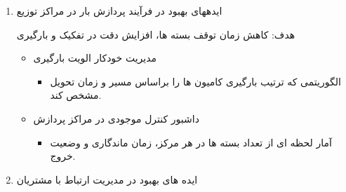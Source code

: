 \documentclass[12pt,a4paper]{report}
\begin{document}
\begin{enumerate}
هدف : کاهش هزینه سوخت، زمان حمل و افزایش بهره وری وسایل نقلیه.
\begin{itemize}
	\item مسیر یابی خودکار
	\begin{itemize}
		\item 
استفاده از الگوریتم های بهینه سازی مسیر بر اساس حجم مرسولات و وضعیت ترافیک. 
		\item 
تخصیص بهینه راننده به مسیر.
	\end{itemize}
	\item سیستم مدیریت نگهداری خودرو ها
	\begin{itemize}
		\item 
ثبت خودکار کیلومتر کارکرد و زمان آخرین سرویس از طریق  یا ورودی راننده.
		\item هشدار خودکار برای سیرویس یا بیمه در آستانه انقاضا.
	\end{itemize}
	\item سیستم سوخت و هزینه های سفر
	\begin{itemize}
		\item
هر راننده هنگام بازگشت هزینه سوخت را در سیستم ثبت می کند.
		\item 
تحلیل مصرف سوخت به تفکیک مسیر و نوع خودرو.
	\end{itemize}
	\item داشبورد عملکرد رانندگان
	\begin{itemize}
		\item 
شاخص هایی ماند میانگین تاخیر، مصرف سوخت و امتیاز رضایت مشتری
		\item 
پاداش برای رانندگان منظم و کارآمد
	\end{itemize}
\end{itemize}
	\item ایدههای بهبود در فرآیند پردازش بار در مراکز توزیع 

هدف: کاهش زمان توقف بسته ها، افزایش دقت در تفکیک و بارگیری
\begin{itemize}
	\item مدیریت خودکار الویت بارگیری
	\begin{itemize}
		\item الگوریتمی که ترتیب بارگیری کامیون ها را براساس مسیر و زمان تحویل مشخص کند.
	\end{itemize}
	\item داشبور کنترل موجودی در مراکز پردازش
	\begin{itemize}
		\item 
آمار لحظه ای از تعداد بسته ها در هر مرکز، زمان ماندگاری و وضعیت خروج.	
	\end{itemize}
\end{itemize}
	\item ایده های بهبود در مدیریت ارتباط با مشتریان


\end{enumerate}
\end{document}
